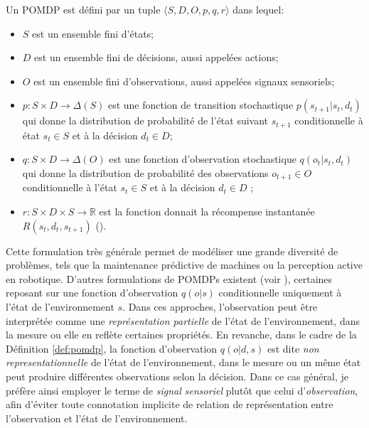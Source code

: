 \begin{De}[POMDP]
	\label{def:pomdp}
	Un POMDP est défini par un tuple $\langle S, D, O,p,q,r \rangle$ dans lequel:
	\begin{itemize}[label=\scalebox{.85}{$\diamond$}]
		\item $S$ est un ensemble fini d'états;
		\item $D$ est un ensemble fini de décisions, aussi appelées actions;
		\item $O$ est un ensemble fini d'observations, aussi appelées signaux sensoriels;
		\item $p:S\times D\rightarrow\Delta(S)$ est une fonction de transition stochastique $p(s_{t+1}|s_t,d_t)$ qui donne la distribution de probabilité de l'état suivant $s_{t+1}$ conditionnelle à état $s_t\in S$ et à la décision $d_t\in D$;
		\item $q:S\times D\rightarrow\Delta(O)$ est une fonction d'observation stochastique $q(o_{t}|s_t,d_t)$ qui donne la distribution de probabilité des observations $o_{t+1} \in O$ conditionnelle à l'état $s_t\in S$ et à la décision $d_t\in D$ ;
		\item $r:S\times D \times S \rightarrow \mathbb{R} $ est la fonction donnait la récompense instantanée $R(s_t, d_t, s_{t+1})$ ().
	\end{itemize}
\end{De}



Cette formulation très générale permet de modéliser une grande diversité de problèmes, tels que la maintenance prédictive de machines ou la perception active en robotique. 
D'autres formulations de POMDPs existent (voir \cite{chatterjee_what_2016}), certaines reposant sur une fonction d'observation $q(o|s)$ conditionnelle uniquement à l'état de l'environnement $s$.
Dans ces approches, l'observation peut être interprétée comme une \emph{représentation partielle} de l'état de l'environnement, dans la mesure ou elle en reflète certaines propriétés. 
En revanche, dans le cadre de la Définition \ref{def:pomdp}, la fonction d'observation $q(o|d, s)$ est dite \emph{non representationnelle} de l'état de l'environnement, dans le mesure ou un même état peut produire différentes observations selon la décision.
Dans ce cas général, je préfère ainsi employer le terme de \emph{signal sensoriel} plutôt que celui d'\emph{observation}, afin d'éviter toute connotation implicite de relation de représentation entre l'observation et l'état de l'environnement. 


